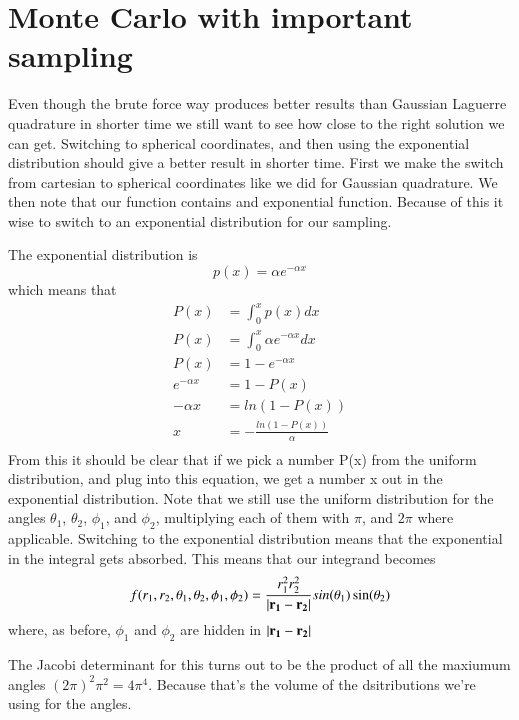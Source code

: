 \documentclass{aa}   %
\begin{document}
\section{Monte Carlo with important sampling}\label{sec:Monte Carlo import}
Even though the brute force way produces better results than Gaussian Laguerre quadrature in shorter time we still want to see how close to the right solution we can get. Switching to spherical coordinates, and then using the exponential distribution should give a better result in shorter time. First we make the switch from cartesian to spherical coordinates like we did for Gaussian quadrature. We then note that our function contains and exponential function. Because of this it wise to switch to an exponential distribution for our sampling.

The exponential distribution is
\begin{equation*}
 p(x) = \alpha e^{-\alpha x}
\end{equation*}
which means that
\begin{equation*}
\begin{aligned}
P(x) &= \int_0^x p(x)dx\\
P(x) &= \int_0^x \alpha e^{-\alpha x}dx\\
P(x) &= 1-e^{-\alpha x}\\
e^{-\alpha x} &= 1-P(x)\\
-\alpha x &= ln(1-P(x))\\
x &= -\frac{ln(1-P(x))}{\alpha}\\
\end{aligned}
\end{equation*}
From this it should be clear that if we pick a number P(x) from the uniform distribution, and plug into this equation, we get a number x out in the exponential distribution.
Note that we still use the uniform distribution for the angles $\theta_1$, $\theta_2$, $\phi_1$, and $\phi_2$, multiplying each of them with $\pi$, and $2\pi$ where applicable.
Switching to the exponential distribution means that the exponential in the integral gets absorbed.
This means that our integrand becomes 
\begin{equation}
 f(r_1,r_2,\theta_1,\theta_2,\phi_1,\phi_2) =  \frac{r_1^2 r_2^2}{|\bf r_1 - r_2|} sin(\theta_1)\sin(\theta_2)
\end{equation}
where, as before, $\phi_1$ and $\phi_2$ are hidden in $\bf|r_1 -r_2|$

The Jacobi determinant for this turns out to be the product of all the maxiumum angles $(2\pi)^2\pi^2 = 4\pi^4$. Because that's the volume of the dsitributions we're using for the angles.
\end{document}
